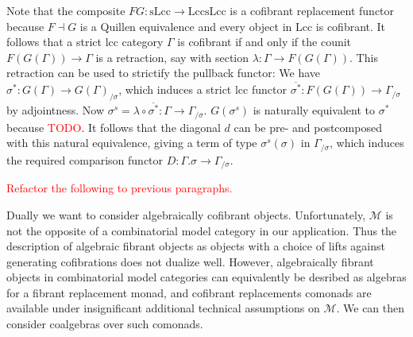 \documentclass{article}
\newcommand{\todo}[1]{\textcolor{red}{#1}}
\begin{document}
Note that the composite $FG : \mathrm{sLcc} \rightarrow \mathrm{Lcc} \mathrm{sLcc}$ is a cofibrant replacement functor because $F \dashv G$ is a Quillen equivalence and every object in $\mathrm{Lcc}$ is cofibrant.
It follows that a strict lcc category $\Gamma$ is cofibrant if and only if the counit $F(G(\Gamma)) \rightarrow \Gamma$ is a retraction, say with section $\lambda : \Gamma \rightarrow F(G(\Gamma))$.
This retraction can be used to strictify the pullback functor:
We have $\sigma^* : G(\Gamma) \rightarrow G(\Gamma)_{/ \sigma}$, which induces a strict lcc functor $\overline{\sigma^*} : F(G(\Gamma)) \rightarrow \Gamma_{/ \sigma}$ by adjointness.
Now $\sigma^s = \lambda \circ \overline{\sigma^*} : \Gamma \rightarrow \Gamma_{/ \sigma}$.
$G(\sigma^s)$ is naturally equivalent to $\sigma^*$ because \todo{TODO}.
It follows that the diagonal $d$ can be pre- and postcomposed with this natural equivalence, giving a term of type $\sigma^s(\sigma)$ in $\Gamma_{/ \sigma}$, which induces the required comparison functor $D : \Gamma.\sigma \rightarrow \Gamma_{/ \sigma}$.

\todo{Refactor the following to previous paragraphs.}

Dually we want to consider algebraically cofibrant objects.
Unfortunately, $\mathcal{M}$ is not the opposite of a combinatorial model category in our application.
Thus the description of algebraic fibrant objects as objects with a choice of lifts against generating cofibrations does not dualize well.
However, algebraically fibrant objects in combinatorial model categories can equivalently be desribed as algebras for a fibrant replacement monad, and cofibrant replacements comonads are available under insignificant additional technical assumptions on $\mathcal{M}$.
We can then consider coalgebras over such comonads.
\end{document}
